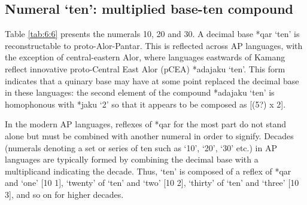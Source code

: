 \documentclass[output=paper]{LSP/langsci}
\begin{document}
\subsection{Numeral `ten': multiplied base-ten compound} \label{sec:6:6.1}
Table \ref{tab:6:6} presents the numerals 10, 20 and 30. A decimal base *qar `ten' is reconstructable to proto-Alor-Pantar. This is reflected across AP languages, with the exception of central-eastern Alor, where languages eastwards of Kamang reflect innovative proto-Central East Alor (pCEA) *adajaku `ten'. This form indicates that a quinary base may have at some point replaced the decimal base in these languages: the second element of the compound *adajaku `ten' is homophonous with *jaku `2' so that it appears to be composed as [(5?) x 2]. 

In the modern AP languages, reflexes of *qar for the most part do not stand alone but must be combined with another numeral in order to signify. Decades (numerals denoting a set or series of ten such as `10', `20', `30' etc.) in AP languages are typically formed by combining the decimal base with a multiplicand indicating the decade. Thus, `ten' is composed of a reflex of *qar and `one' [10 1], `twenty' of `ten' and `two' [10 2], `thirty' of `ten' and `three' [10 3], and so on for higher decades. 
\end{document}
